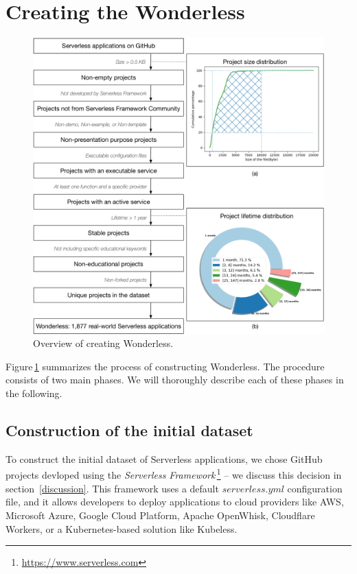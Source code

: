 
\section{Creating the Wonderless}
\label{dataset}

\begin{figure}
	\centering
	\includegraphics[scale=0.3]{figures/processOverviewFinalgraffle}
	\caption{Overview of creating Wonderless.}
	\label{fig:overview}
\end{figure}


Figure\,\ref{fig:overview} summarizes the  process of constructing Wonderless. 
The procedure consists of two main phases. 
We will thoroughly describe each of these phases in the following.

\subsection{Construction of the initial dataset} \label{phaseA}

To construct the initial dataset of Serverless applications, we chose GitHub projects 
devloped using the \emph{Serverless Framework}\,\footnote{\url{https://www.serverless.com}} 
-- we discuss this decision in section~\ref{discussion}.
This framework uses a default $serverless.yml$ configuration file, 
and it allows developers to deploy 
applications to cloud providers like AWS, Microsoft Azure, Google Cloud 
Platform, Apache OpenWhisk, Cloudflare Workers, or a Kubernetes-based 
solution like Kubeless.

